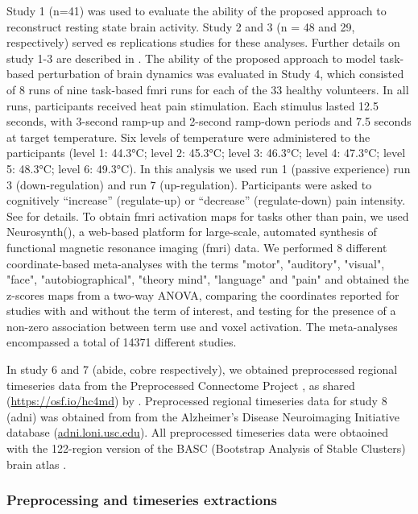 \documentclass{article}
\begin{document}
Study 1 (n=41) was used to evaluate the ability of the proposed approach to reconstruct resting state brain activity. Study 2 and 3 (n = 48 and 29, respectively) served es replications studies for these analyses. Further details on study 1-3 are described in \cite{Spisak_2020}. The ability of the proposed approach to model task-based perturbation of brain dynamics was evaluated in Study 4, which consisted of 8 runs of nine task-based \acrshort{fmri} runs for each of the 33 healthy volunteers. In all runs, participants received heat pain stimulation. Each stimulus lasted 12.5 seconds, with 3-second ramp-up and 2-second ramp-down periods and 7.5 seconds at target temperature. Six levels of temperature were a\acrshort{dm}inistered to the participants (level 1: 44.3°C; level 2: 45.3°C; level 3: 46.3°C; level 4: 47.3°C; level 5: 48.3°C; level 6: 49.3°C). In this analysis we used run 1 (passive experience)  run 3 (down-regulation) and run 7 (up-regulation). Participants were asked to cognitively ``increase'' (regulate-up) or ``decrease'' (regulate-down) pain intensity. See \citet{woo2015distinct} for details.
To obtain \acrshort{fmri} activation maps for tasks other than pain, we used Neurosynth(\cite{Tor_D__2011}), a web-based platform for large-scale, automated synthesis of functional magnetic resonance imaging (\acrshort{fmri}) data. We performed 8 different coordinate-based meta-analyses with the terms "motor", "auditory", "visual", "face", "autobiographical", "theory mind", "language" and "pain" and obtained the z-scores maps from a two-way ANOVA, comparing the coordinates reported for studies with and without the term of interest, and testing for the presence of a non-zero association between term use and voxel activation. The meta-analyses encompassed a total  of 14371 different studies.

In study 6 and 7 (\acrshort{abide}, \acrshort{cobre} respectively), we obtained preprocessed regional timeseries data from the Preprocessed Connectome Project \citep{craddock2013towards}, as shared (\href{https://osf.io/hc4md}{https://osf.io/hc4md}) by \citet{dadi2019benchmarking}. Preprocessed regional timeseries data for study 8 (\acrshort{adni}) was obtained from from the Alzheimer's Disease Neuroimaging Initiative database (\href{http://adni.loni.usc.edu}{adni.loni.usc.edu}). All preprocessed timeseries data were obtaoined with the 122-region version of the BASC (Bootstrap Analysis of Stable Clusters) brain atlas \citep{bellec2010multi}.

\subsubsection{Preprocessing and timeseries extractions}\label{Preprocessing and timeseries extractions}
\end{document}
